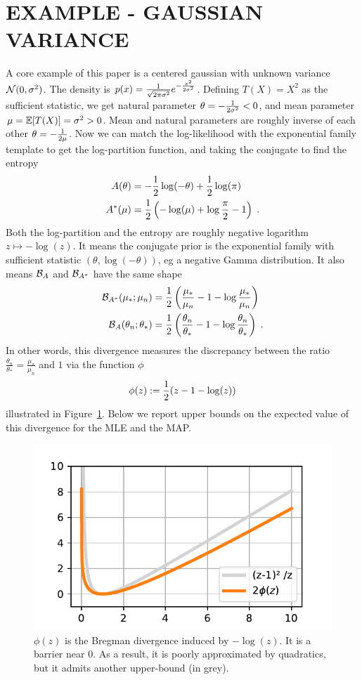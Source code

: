 \documentclass[twoside]{article}
\let\oldsection\section
\renewcommand{\section}[1]{\oldsection{\uppercase{#1}}}
\newcommand{\logpart}{A}
\newcommand{\conj}{\logpart^*}
\newcommand{\bregman}{\cB_\logpart}
\newcommand{\bregmanconj}{\cB_{\logpart^*}}
\newcommand{\natp}{\theta}
\begin{document}
\section{Example - Gaussian Variance}
A core example of this paper is a centered gaussian with unknown variance ${\mathcal N}(0,\sigma^2)$. 
The density is	$p(x) = \frac{1}{\sqrt{2\pi \sigma^2}} e^{-\frac{x^2}{2 \sigma^2}}$.
Defining $T(X)=X^2$ as the sufficient statistic, we get natural parameter $\natp = -\inv{2 \sigma^2} <0$, and mean parameter $\mu=\operatorname{\mathbb{E}}[T(X)] = \sigma^2 >0$. 
Mean and natural parameters are roughly inverse of each other $\natp = -\inv{2 \mu}$.
Now we can match the log-likelihood with the exponential family template to get the log-partition function, and taking the conjugate to find the entropy
\begin{align}
	\logpart (\natp) &= - \half \log(-\natp)  + \half \log(\pi) \\
	\conj(\mu) &= \half\left( -\log(\mu) + \log\frac{\pi}{2} - 1 \right) \; .
\end{align}
Both the log-partition and  the entropy are roughly negative logarithm $z\mapsto - \log(z)$.
It means the conjugate prior is the exponential family with sufficient statistic $(\natp, \log(-\natp) )$, eg a negative Gamma distribution.
It also means $\bregman$ and $\bregmanconj$ have the same shape
\begin{align}
	\bregmanconj( \mu_*; \mu_n) 
	&= \half \left ( \frac{\mu_*}{ \mu_n} - 1 - \log  \frac{\mu_*}{ \mu_n} \right) \\
	\bregman( \natp_n; \natp_* )
	&=  \half \left ( \frac{ \natp_n}{\natp_*} - 1 - \log  \frac{ \natp_n}{\natp_*} \right) \; .
\end{align}
In other words, this divergence measures the discrepancy between the ratio $\frac{ \natp_n}{\natp_*} =  \frac{\mu_*}{ \mu_n}  $ and $1$ via the function $\phi$
\begin{align}
	\phi(z) := \frac{1}{2} (z - 1 - \log(z))
\end{align}
illustrated in Figure~\ref{fig:phi}. 
Below we report upper bounds on the expected value of this divergence for the MLE and the MAP.


\begin{figure}[ht]
	\centering
	\includegraphics[width=.4\textwidth]{phi.pdf}
	\caption{$\phi(z)$ is the Bregman divergence induced by $-\log(z)$. It is a barrier near $0$. As a result, it is poorly approximated by quadratics, but it admits another upper-bound (in grey).}
	\label{fig:phi}
\end{figure}
\end{document}
